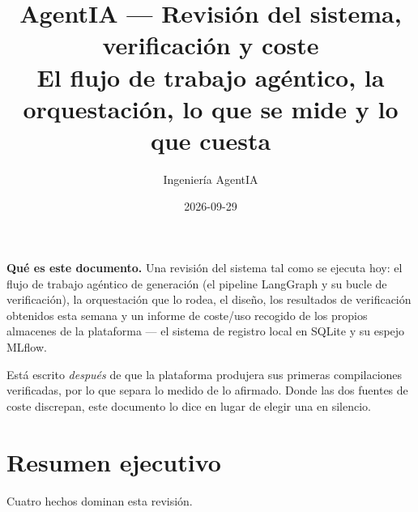 \documentclass[11pt,a4paper]{article}
\title{\vspace{-1.4cm}\textbf{AgentIA --- Revisión del sistema, verificación y coste}\\[0.25cm]
\large El flujo de trabajo agéntico, la orquestación, lo que se mide y lo que cuesta}
\author{Ingeniería AgentIA}
\date{2026-09-29}
\begin{document}
\maketitle
\thispagestyle{fancy}

\begin{notebox}
\textbf{Qué es este documento.} Una revisión del sistema tal como se ejecuta hoy: el
flujo de trabajo agéntico de generación (el pipeline LangGraph y su bucle de
verificación), la orquestación que lo rodea, el diseño, los resultados de verificación
obtenidos esta semana y un informe de coste/uso recogido de los propios almacenes de
la plataforma --- el sistema de registro local en SQLite y su espejo MLflow.

Está escrito \emph{después} de que la plataforma produjera sus primeras compilaciones
verificadas, por lo que separa lo medido de lo afirmado. Donde las dos fuentes de
coste discrepan, este documento lo dice en lugar de elegir una en silencio.
\end{notebox}

\tableofcontents
\vspace{0.4cm}

\section{Resumen ejecutivo}

Cuatro hechos dominan esta revisión.
\end{document}
